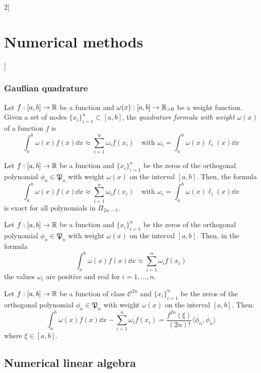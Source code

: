 \documentclass[../../../main_math.tex]{subfiles}
\begin{document}
\begin{multicols}{2}[\section{Numerical methods}]
  \subsubsection{Gau\ss ian quadrature}
  \begin{definition}
    Let $f:[a,b]\rightarrow\mathbb{R}$ be a function and $\omega(x):[a,b]\rightarrow\mathbb{R}_{>0}$ be a weight function. Given a set of nodes $\{x_i\}_{i=1}^n\subset[a,b]$, the \emph{quadrature formula with weight $\omega(x)$} of a function $f$ is $$\int_a^b\omega(x)f(x)\dd{x}\approx\sum_{i=1}^n\omega_if(x_i)\quad\!\text{with }\omega_i=\int_a^b\omega(x)\ell_i(x)\dd{x}$$
  \end{definition}
  \begin{lemma}
    Let $f:[a,b]\rightarrow\mathbb{R}$ be a function and $\{x_i\}_{i=1}^n$ be the zeros of the orthogonal polynomial $\phi_n\in\mathfrak{P}_n$ with weight $\omega(x)$ on the interval $[a,b]$. Then, the formula $$\int_a^b\omega(x)f(x)\dd{x}\approx\sum_{i=1}^n\omega_if(x_i)\quad\!\text{with }\omega_i=\int_a^b\omega(x)\ell_i(x)\dd{x}$$ is exact for all polynomials in $\Pi_{2n-1}$.
  \end{lemma}
  \begin{proposition}
    Let $f:[a,b]\rightarrow\mathbb{R}$ be a function and $\{x_i\}_{i=1}^n$ be the zeros of the orthogonal polynomial $\phi_n\in\mathfrak{P}_n$ with weight $\omega(x)$ on the interval $[a,b]$. Then, in the formula $$\int_a^b\omega(x)f(x)\dd{x}\approx\sum_{i=1}^n\omega_if(x_i)$$ the values $\omega_i$ are positive and real for $i=1,\ldots,n$.
  \end{proposition}
  \begin{theorem}
    Let $f:[a,b]\rightarrow\mathbb{R}$ be a function of class $\mathcal{C}^{2n}$ and $\{x_i\}_{i=1}^n$ be the zeros of the orthogonal polynomial $\phi_n\in\mathfrak{P}_n$ with weight $\omega(x)$ on the interval $[a,b]$. Then: $$\int_a^b\omega(x)f(x)\dd{x}-\sum_{i=1}^n\omega_if(x_i)=\frac{f^{2n}(\xi)}{(2n)!}\langle\phi_n,\phi_n\rangle$$ where $\xi\in[a,b]$.
  \end{theorem}
  \subsection{Numerical linear algebra}

\end{multicols}
\end{document}
